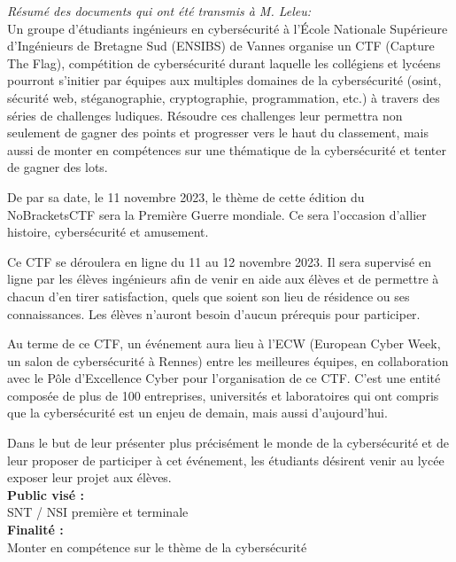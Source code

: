 \documentclass[11pt,a4paper,article]{nsi}
\begin{document}
\classe{}
\maketitle

\textit{Résumé des documents qui ont été transmis à M. Leleu:}\\

Un groupe d’étudiants ingénieurs en cybersécurité à l’École Nationale Supérieure d’Ingénieurs de Bretagne Sud (ENSIBS) de Vannes organise un CTF (Capture The Flag), compétition de cybersécurité durant laquelle les collégiens et lycéens pourront s’initier par équipes aux multiples domaines de la cybersécurité (osint, sécurité web, stéganographie, cryptographie, programmation, etc.) à travers des séries de challenges ludiques. Résoudre ces challenges leur permettra non seulement de gagner des points et progresser vers le haut du classement, mais aussi de monter en compétences sur une thématique de la cybersécurité et tenter de gagner des lots.

De par sa date, le 11 novembre 2023, le thème de cette édition du NoBracketsCTF sera la Première Guerre mondiale. Ce sera l’occasion d’allier histoire, cybersécurité et amusement.

Ce CTF se déroulera en ligne du 11 au 12 novembre 2023. Il sera supervisé en ligne  par les élèves ingénieurs afin de venir en aide aux élèves et de permettre à chacun d’en tirer satisfaction, quels que soient son lieu de résidence ou ses connaissances. Les élèves n’auront besoin d’aucun prérequis pour participer.

Au terme de ce CTF, un événement aura lieu à l’ECW (European Cyber Week, un salon de cybersécurité à Rennes) entre les meilleures équipes, en collaboration avec le Pôle d’Excellence Cyber pour l’organisation de ce CTF. C’est une entité composée de plus de 100 entreprises, universités et laboratoires qui ont compris que la cybersécurité est un enjeu de demain, mais aussi d’aujourd’hui.

Dans le but de leur présenter plus précisément le monde de la cybersécurité et de leur proposer de participer à cet événement, les étudiants désirent venir au lycée exposer leur projet aux élèves.\\

\textbf{Public visé :}\\ SNT / NSI première et terminale\\

\textbf{Finalité :}\\ Monter en compétence sur le thème de la cybersécurité\\
\end{document}
